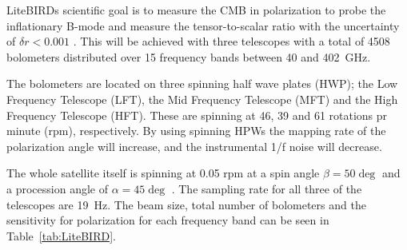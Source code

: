 \documentclass[twocolumn]{aa}
\begin{document}
LiteBIRDs scientific goal is to measure the CMB in polarization to probe the inflationary B-mode and measure the tensor-to-scalar ratio with the uncertainty of $\delta r < 0.001$ \citep{Suzuki_2018}. This will be achieved with three telescopes with a total of 4508 bolometers distributed over 15 frequency bands between 40 and 402~GHz. 

The bolometers are located on three spinning half wave plates (HWP); the Low Frequency Telescope (LFT), the Mid Frequency Telescope (MFT) and the High Frequency Telescope (HFT). These are spinning at 46, 39 and 61 rotations pr minute (rpm), respectively. By using spinning HPWs the mapping rate of the polarization angle will increase, and the instrumental 1/f noise will decrease. 

 The whole satellite itself is spinning at 0.05 rpm at a spin angle $\beta=50\deg$ and a procession angle of $\alpha=45\deg$  \citep{Sugai_2020}. The sampling rate for all three of the telescopes are 19~Hz. The beam size, total number of bolometers and the sensitivity for polarization for each frequency band can be seen in Table~\ref{tab:LiteBIRD}. 





\end{document}
